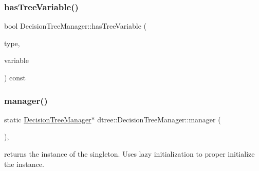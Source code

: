 \mbox{\label{classdtree_1_1_decision_tree_manager_a8429a7681b0a62ec015dcaabff330d29}} 
\subsubsection{\texorpdfstring{hasTreeVariable()}{hasTreeVariable()}}
{\footnotesize\ttfamily bool Decision\+Tree\+Manager\+::has\+Tree\+Variable (\begin{DoxyParamCaption}\item[{\mbox{\hyperlink{classdtree_1_1_decision_tree_manager_a14180eb59d2c245ce3af1c27ddb0846d}{Decision\+Tree\+Manager\+::\+Tree\+Type}}}]{type,  }\item[{\mbox{\hyperlink{namespacedtree_a79fe30831a14df904319f9e783b3189b}{dtree\+::\+Variable}}}]{variable }\end{DoxyParamCaption}) const}

\mbox{\label{classdtree_1_1_decision_tree_manager_a35ea592ac00794339323dcc295f63b0c}} 
\subsubsection{\texorpdfstring{manager()}{manager()}}
{\footnotesize\ttfamily static \mbox{\hyperlink{classdtree_1_1_decision_tree_manager}{Decision\+Tree\+Manager}}$\ast$ dtree\+::\+Decision\+Tree\+Manager\+::manager (\begin{DoxyParamCaption}{ }\end{DoxyParamCaption})\hspace{0.3cm}{\ttfamily [inline]}, {\ttfamily [static]}}



returns the instance of the singleton. Uses lazy initialization to proper initialize the instance. 

\mbox{\label{classdtree_1_1_decision_tree_manager_a5ae8a7074f148056d13051c484974bf6}} 
